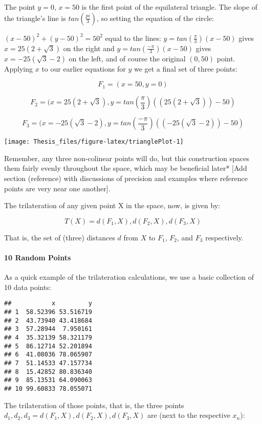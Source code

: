\documentclass[]{article}
\let\oldparagraph\paragraph
\renewcommand{\paragraph}[1]{\oldparagraph{#1}\mbox{}}
\begin{document}
The point \(y=0\), \(x=50\) is the first point of the equilateral
triangle. The slope of the triangle's line is \(tan(\frac{pi}{3})\), so
setting the equation of the circle:

\((x-50)^2+(y-50)^2=50^2\) equal to the lines:
\(y=tan(\frac{\pi}{3})(x-50)\) gives \(x=25(2+\sqrt{3})\) on the right
and \(y=tan(\frac{-\pi}{3})(x-50)\) gives \(x=-25(\sqrt{3}-2)\) on the
left, and of course the original \((0,50)\) point. Applying \(x\) to our
earlier equations for \(y\) we get a final set of three points:

\[F_1 = (x=50,y=0)\]

\[F_2 = (x=25(2+\sqrt{3}), y=tan(\frac{\pi}{3})((25(2+\sqrt{3}))-50)\]

\[F_3 = (x=-25(\sqrt{3}-2), y=tan(\frac{-\pi}{3})((-25(\sqrt{3}-2))-50) \]

\begin{center}\texttt{[image: Thesis\_files/figure-latex/trianglePlot-1]} \end{center}

Remember, any three non-colinear points will do, but this construction
spaces them fairly evenly throughout the space, which may be beneficial
later* {[}Add section (reference) with discussions of precision and
examples where reference points are very near one another{]}.

The trilateration of any given point X in the space, now, is given by:

\[T(X) = {d(F_1, X), d(F_2, X), d(F_3,X)} \]

That is, the set of (three) distances \(d\) from \(X\) to \(F_1\),
\(F_2\), and \(F_3\) respectively.

\paragraph{10 Random Points}\label{random-points}

As a quick example of the trilateration calculations, we use a basic
collection of 10 data points:

\begin{verbatim}
##           x         y
## 1  58.52396 53.516719
## 2  43.73940 43.418684
## 3  57.28944  7.950161
## 4  35.32139 58.321179
## 5  86.12714 52.201894
## 6  41.08036 78.065907
## 7  51.14533 47.157734
## 8  15.42852 80.836340
## 9  85.13531 64.090063
## 10 99.60833 78.055071
\end{verbatim}

The trilateration of those points, that is, the three points
\(d_1, d_2, d_3 = {d(F_1, X), d(F_2, X), d(F_3,X)}\) are (next to the
respective \(x_n\)):
\end{document}
